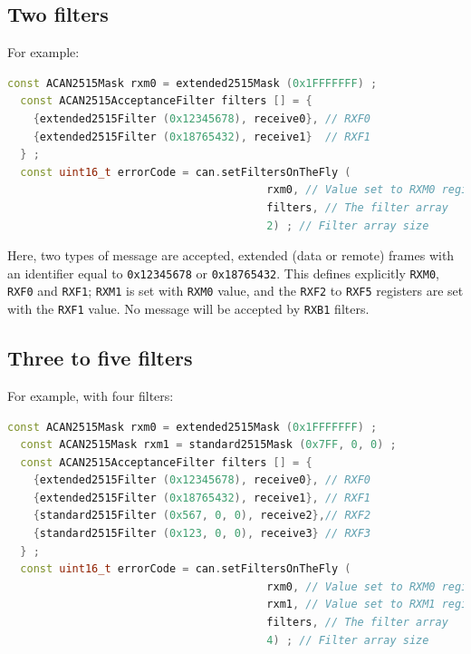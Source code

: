 \documentclass[10pt, a4paper, obeyspaces]{extarticle}
\begin{document}
\subsection{Two filters}

For example:
{ \small\begin{lstlisting}[language=c++]
  const ACAN2515Mask rxm0 = extended2515Mask (0x1FFFFFFF) ;
  const ACAN2515AcceptanceFilter filters [] = {
    {extended2515Filter (0x12345678), receive0}, // RXF0
    {extended2515Filter (0x18765432), receive1}  // RXF1
  } ;
  const uint16_t errorCode = can.setFiltersOnTheFly (
                                        rxm0, // Value set to RXM0 register
                                        filters, // The filter array
                                        2) ; // Filter array size
\end{lstlisting}}

Here, two types of message are accepted, extended (data or remote) frames with an identifier equal to \texttt{0x12345678} or \texttt{0x18765432}. This defines explicitly \texttt{RXM0}, \texttt{RXF0} and \texttt{RXF1}; \texttt{RXM1} is set with \texttt{RXM0} value, and the \texttt{RXF2} to \texttt{RXF5} registers are set with the \texttt{RXF1} value. No message will be accepted by \texttt{RXB1} filters.










\subsection{Three to five filters}

For example, with four filters:
{ \small\begin{lstlisting}[language=c++]
  const ACAN2515Mask rxm0 = extended2515Mask (0x1FFFFFFF) ;
  const ACAN2515Mask rxm1 = standard2515Mask (0x7FF, 0, 0) ;
  const ACAN2515AcceptanceFilter filters [] = {
    {extended2515Filter (0x12345678), receive0}, // RXF0
    {extended2515Filter (0x18765432), receive1}, // RXF1
    {standard2515Filter (0x567, 0, 0), receive2},// RXF2
    {standard2515Filter (0x123, 0, 0), receive3} // RXF3
  } ;
  const uint16_t errorCode = can.setFiltersOnTheFly (
                                        rxm0, // Value set to RXM0 register
                                        rxm1, // Value set to RXM1 register
                                        filters, // The filter array
                                        4) ; // Filter array size
\end{lstlisting}}
\end{document}
